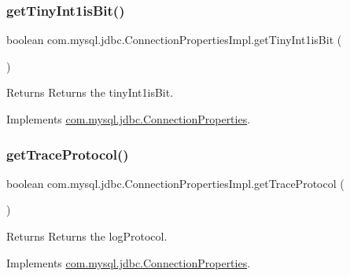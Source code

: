 \subsubsection{\texorpdfstring{get\+Tiny\+Int1is\+Bit()}{getTinyInt1isBit()}}
{\footnotesize\ttfamily boolean com.\+mysql.\+jdbc.\+Connection\+Properties\+Impl.\+get\+Tiny\+Int1is\+Bit (\begin{DoxyParamCaption}{ }\end{DoxyParamCaption})}

\begin{DoxyReturn}{Returns}
Returns the tiny\+Int1is\+Bit. 
\end{DoxyReturn}


Implements \mbox{\hyperlink{interfacecom_1_1mysql_1_1jdbc_1_1_connection_properties_a3bde53c87aba637f1e0833d504e96742}{com.\+mysql.\+jdbc.\+Connection\+Properties}}.

\mbox{\label{classcom_1_1mysql_1_1jdbc_1_1_connection_properties_impl_a22dbcbcac64b1425e6eae93481f4f9b7}} 
\subsubsection{\texorpdfstring{get\+Trace\+Protocol()}{getTraceProtocol()}}
{\footnotesize\ttfamily boolean com.\+mysql.\+jdbc.\+Connection\+Properties\+Impl.\+get\+Trace\+Protocol (\begin{DoxyParamCaption}{ }\end{DoxyParamCaption})}

\begin{DoxyReturn}{Returns}
Returns the log\+Protocol. 
\end{DoxyReturn}


Implements \mbox{\hyperlink{interfacecom_1_1mysql_1_1jdbc_1_1_connection_properties_ac91e629cc7505335e1de76be5d070102}{com.\+mysql.\+jdbc.\+Connection\+Properties}}.

\mbox{\label{classcom_1_1mysql_1_1jdbc_1_1_connection_properties_impl_a06e5e6007f2b5099a136142011894c74}} 
